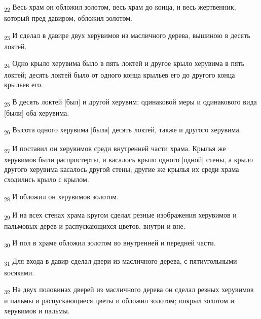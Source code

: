 \begin{tcolorbox}
\textsubscript{22} Весь храм он обложил золотом, весь храм до конца, и весь жертвенник, который пред давиром, обложил золотом.
\end{tcolorbox}
\begin{tcolorbox}
\textsubscript{23} И сделал в давире двух херувимов из масличного дерева, вышиною в десять локтей.
\end{tcolorbox}
\begin{tcolorbox}
\textsubscript{24} Одно крыло херувима было в пять локтей и другое крыло херувима в пять локтей; десять локтей было от одного конца крыльев его до другого конца крыльев его.
\end{tcolorbox}
\begin{tcolorbox}
\textsubscript{25} В десять локтей [был] и другой херувим; одинаковой меры и одинакового вида [были] оба херувима.
\end{tcolorbox}
\begin{tcolorbox}
\textsubscript{26} Высота одного херувима [была] десять локтей, также и другого херувима.
\end{tcolorbox}
\begin{tcolorbox}
\textsubscript{27} И поставил он херувимов среди внутренней части храма. Крылья же херувимов были распростерты, и касалось крыло одного [одной] стены, а крыло другого херувима касалось другой стены; другие же крылья их среди храма сходились крыло с крылом.
\end{tcolorbox}
\begin{tcolorbox}
\textsubscript{28} И обложил он херувимов золотом.
\end{tcolorbox}
\begin{tcolorbox}
\textsubscript{29} И на всех стенах храма кругом сделал резные изображения херувимов и пальмовых дерев и распускающихся цветов, внутри и вне.
\end{tcolorbox}
\begin{tcolorbox}
\textsubscript{30} И пол в храме обложил золотом во внутренней и передней части.
\end{tcolorbox}
\begin{tcolorbox}
\textsubscript{31} Для входа в давир сделал двери из масличного дерева, с пятиугольными косяками.
\end{tcolorbox}
\begin{tcolorbox}
\textsubscript{32} На двух половинах дверей из масличного дерева он сделал резных херувимов и пальмы и распускающиеся цветы и обложил золотом; покрыл золотом и херувимов и пальмы.
\end{tcolorbox}

